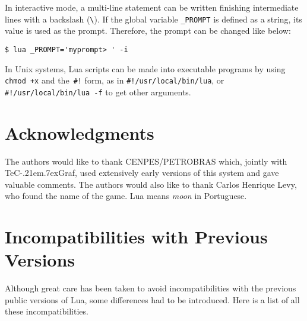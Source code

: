 \documentclass[11pt]{article}
\def\tecgraf{{\sf TeC\kern-.21em\lower.7ex\hbox{Graf}}}
\begin{document}
In interactive mode,
a multi-line statement can be written finishing intermediate
lines with a backslash (\verb|\|).
If the global variable \verb|_PROMPT| is defined as a string,
its value is used as the prompt. 
Therefore, the prompt can be changed like below:
\begin{verbatim}
$ lua _PROMPT='myprompt> ' -i
\end{verbatim}

In Unix systems, Lua scripts can be made into executable programs
by using \verb|chmod +x| and the~\verb|#!| form,
as in \verb|#!/usr/local/bin/lua|,
or \verb|#!/usr/local/bin/lua -f| to get other arguments.


\section*{Acknowledgments}

The authors would like to thank CENPES/PETROBRAS which,
jointly with \tecgraf, used extensively early versions of
this system and gave valuable comments.
The authors would also like to thank Carlos Henrique Levy,
who found the name of the game.
Lua means \emph{moon} in Portuguese.


\appendix

\section*{Incompatibilities with Previous Versions}

Although great care has been taken to avoid incompatibilities with
the previous public versions of Lua,
some differences had to be introduced.
Here is a list of all these incompatibilities.
\end{document}
